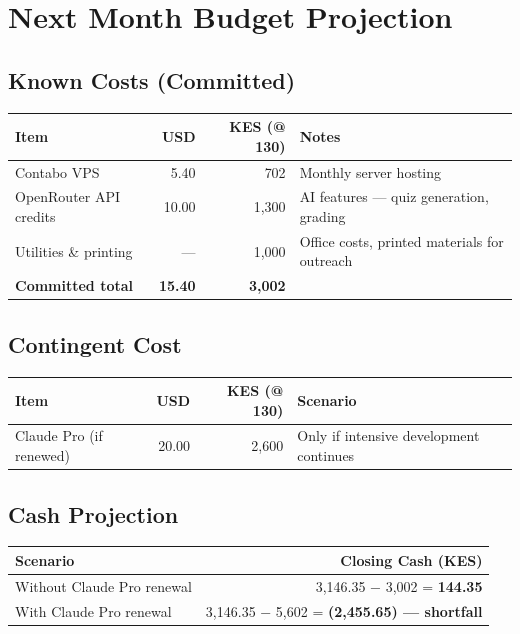\documentclass[12pt,a4paper]{article}
\begin{document}
\section{Next Month Budget Projection}

\subsection{Known Costs (Committed)}

\begin{tabularx}{\linewidth}{X r r l}
\toprule
\textbf{Item} & \textbf{USD} & \textbf{KES (@ 130)} & \textbf{Notes} \\
\midrule
\rowcolor{rowgray}
Contabo VPS & 5.40 & 702 & Monthly server hosting \\
OpenRouter API credits & 10.00 & 1,300 & AI features — quiz generation, grading \\
\rowcolor{rowgray}
Utilities \& printing & — & 1,000 & Office costs, printed materials for outreach \\
\midrule
\textbf{Committed total} & \textbf{15.40} & \textbf{3,002} & \\
\bottomrule
\end{tabularx}

\subsection{Contingent Cost}

\begin{tabularx}{\linewidth}{X r r l}
\toprule
\textbf{Item} & \textbf{USD} & \textbf{KES (@ 130)} & \textbf{Scenario} \\
\midrule
\rowcolor{rowgray}
Claude Pro (if renewed) & 20.00 & 2,600 & Only if intensive development continues \\
\bottomrule
\end{tabularx}

\subsection{Cash Projection}

\begin{tabularx}{\linewidth}{X r}
\toprule
\textbf{Scenario} & \textbf{Closing Cash (KES)} \\
\midrule
\rowcolor{rowgray}
Without Claude Pro renewal & 3,146.35 − 3,002 = \textbf{144.35} \\
With Claude Pro renewal & 3,146.35 − 5,602 = \textbf{(2,455.65) — shortfall} \\
\bottomrule
\end{tabularx}
\end{document}
